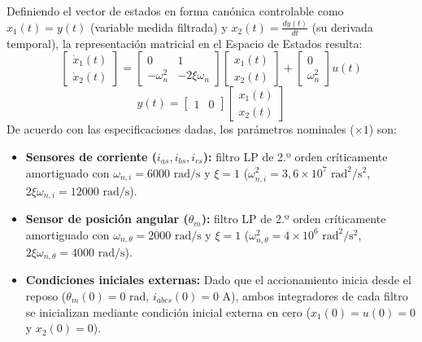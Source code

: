 \documentclass[blue,fullpaper]{ludusofficial}  %
\begin{document}
Definiendo el vector de estados en forma canónica controlable como $x_1(t) = y(t)$ (variable medida filtrada) y $x_2(t) = \frac{dy(t)}{dt}$ (su derivada temporal), la representación matricial en el Espacio de Estados resulta:
\begin{equation}
    \begin{bmatrix} \dot{x}_1(t) \\ \dot{x}_2(t) \end{bmatrix} = 
    \begin{bmatrix} 0 & 1 \\ -\omega_n^2 & -2\xi\omega_n \end{bmatrix} 
    \begin{bmatrix} x_1(t) \\ x_2(t) \end{bmatrix} + 
    \begin{bmatrix} 0 \\ \omega_n^2 \end{bmatrix} u(t)
\end{equation}
\begin{equation}
    y(t) = \begin{bmatrix} 1 & 0 \end{bmatrix} \begin{bmatrix} x_1(t) \\ x_2(t) \end{bmatrix}
\end{equation}
De acuerdo con las especificaciones dadas, los parámetros nominales ($\times 1$) son:
\begin{itemize}
    \item \textbf{Sensores de corriente ($i_{as}, i_{bs}, i_{cs}$):} filtro LP de 2.º orden críticamente amortiguado con $\omega_{n,i} = 6000\text{ rad/s}$ y $\xi = 1$ ($\omega_{n,i}^2 = 3,6 \times 10^7\text{ rad}^2/\text{s}^2$, $2\xi\omega_{n,i} = 12000\text{ rad/s}$).
    \item \textbf{Sensor de posición angular ($\theta_m$):} filtro LP de 2.º orden críticamente amortiguado con $\omega_{n,\theta} = 2000\text{ rad/s}$ y $\xi = 1$ ($\omega_{n,\theta}^2 = 4 \times 10^6\text{ rad}^2/\text{s}^2$, $2\xi\omega_{n,\theta} = 4000\text{ rad/s}$).
    \item \textbf{Condiciones iniciales externas:} Dado que el accionamiento inicia desde el reposo ($\theta_m(0) = 0\text{ rad}$, $i_{abcs}(0) = 0\text{ A}$), ambos integradores de cada filtro se inicializan mediante condición inicial externa en cero ($x_1(0) = u(0) = 0$ y $x_2(0) = 0$).
\end{itemize}
\end{document}
